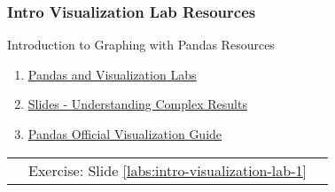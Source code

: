 \documentclass[handout, 11pt]{beamer}
\begin{document}
\begin{frame}
\frametitle{Intro Visualization Lab Resources}
{
\begin{block}{Introduction to Graphing with Pandas Resources}
\begin{enumerate}
\item \textcolor{blue}{\underline{\href{https://nickderobertis.github.io/fin-model-course/\_static/Materials for Lab Exercises/Visualization/Pandas and Visualization Labs.ipynb}{Pandas and Visualization Labs}}}
\item \textcolor{blue}{\underline{\href{https://nickderobertis.github.io/fin-model-course/\_static/generated/pdfs/S6 Understanding Complex Results.pdf}{Slides - Understanding Complex Results}}}
\item \textcolor{blue}{\underline{\href{https://pandas.pydata.org/pandas-docs/stable/user\_guide/visualization.html}{Pandas Official Visualization Guide}}}
\end{enumerate}
\vfill
\begin{tabular*}{\textwidth}{@{\extracolsep{\fill}}ccc}
\toprule
\hfill & Exercise: Slide \textcolor{blue}{\underline{\ref{labs:intro-visualization-lab-1}}} & \hfill\\

\end{tabular*}
\end{block}
}
\label{labs:intro-visualization-lab-1-resources}
\end{frame}
\setcounter{framenumber}{\value{finalframe}}
\end{document}
